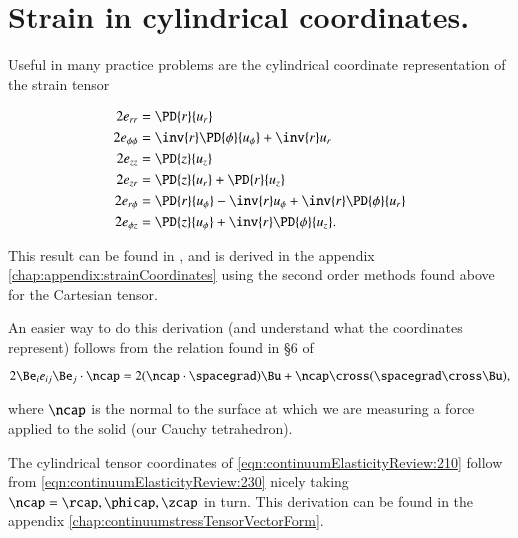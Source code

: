 % 
% 
% 
% 
% 
% 
% 
% 
% 
% 
% 
% 

\section{Strain in cylindrical coordinates.}

Useful in many practice problems are the cylindrical coordinate representation of the strain tensor 

\begin{align}\label{eqn:continuumElasticityReview:210}
2 e_{rr} &= \PD{r}{u_r}  \\
2 e_{\phi\phi} &= \inv{r} \PD{\phi}{u_\phi} +\inv{r} u_r  \\
2 e_{zz} &= \PD{z}{u_z}  \\
2 e_{zr} &= \PD{z}{u_r} + \PD{r}{u_z} \\
2 e_{r\phi} &= \PD{r}{u_\phi} - \inv{r} u_\phi + \inv{r} \PD{\phi}{u_r} \\
2 e_{\phi z} &= \PD{z}{u_\phi} +\inv{r} \PD{\phi}{u_z}.
\end{align}

This result can be found in \cite{landau1960theory}, and is derived in the appendix \ref{chap:appendix:strainCoordinates} using the second order methods found above for the Cartesian tensor.

An easier way to do this derivation (and understand what the coordinates represent) follows from the relation found in \S 6 of \cite{acheson1990elementary}

\begin{equation}\label{eqn:continuumElasticityReview:230}
2 \Be_i e_{ij} \Be_j \cdot \ncap = 2 (\ncap \cdot \spacegrad) \Bu + \ncap \cross (\spacegrad \cross \Bu),
\end{equation}

where $\ncap$ is the normal to the surface at which we are measuring a force applied to the solid (our Cauchy tetrahedron).

The cylindrical tensor coordinates of \ref{eqn:continuumElasticityReview:210} follow from 
\ref{eqn:continuumElasticityReview:230} nicely taking $\ncap = \rcap, \phicap, \zcap$ in turn.  This derivation can be found in the appendix \ref{chap:continuumstressTensorVectorForm}.
